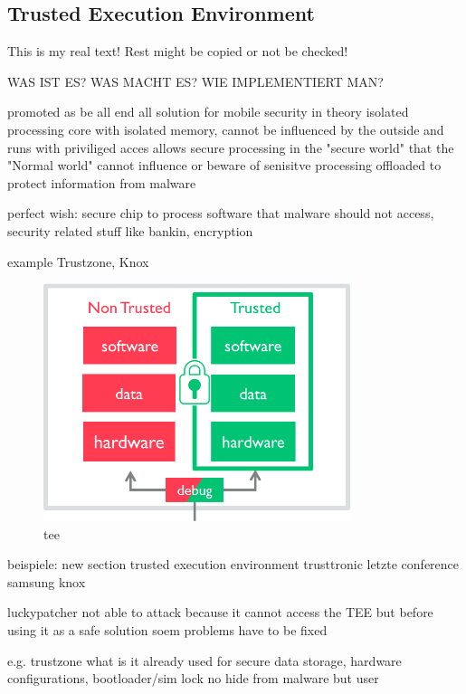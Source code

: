 \subsection{Trusted Execution Environment} \label{section:counter-external-tee}
This is my real text! Rest might be copied or not be checked!

WAS IST ES?
WAS MACHT ES?
WIE IMPLEMENTIERT MAN?

%
promoted as be all end all solution for mobile security
in theory isolated processing core with isolated memory, cannot be influenced by the outside and runs with priviliged acces
allows secure processing in the "secure world" that the "Normal world" cannot influence or beware of
senisitve processing offloaded to protect information from malware

perfect wish:
secure chip to process software that malware should not access, security related stuff like bankin, encryption

example Trustzone, Knox
\begin{figure}[h]
    \centering
    \includegraphics[width=0.8\textwidth]{data/tee.png}
    \caption{tee \cite{armTz}}
    \label{fig:tee}
\end{figure}


\cite{dragonTZ}\cite{armTz}
%



beispiele:
new section trusted execution environment
trusttronic letzte conference
samsung knox


luckypatcher not able to attack because it cannot access the TEE but before using it as a safe solution soem problems have to be fixed

%
e.g. trustzone
what is it already used for
secure data storage, hardware configurations, bootloader/sim lock
no hide from malware but user

